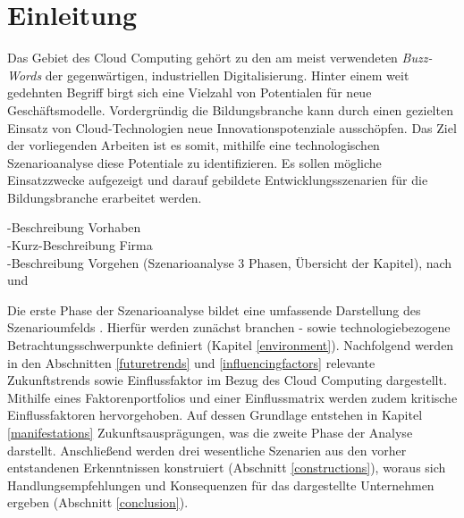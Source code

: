 \section{Einleitung}
\label{introduction}
Das Gebiet des Cloud Computing gehört zu den am meist verwendeten \textit{Buzz-Words} der gegenwärtigen, industriellen Digitalisierung.  Hinter einem weit gedehnten Begriff birgt sich eine Vielzahl von Potentialen für neue Geschäftsmodelle. Vordergründig die Bildungsbranche kann durch einen gezielten Einsatz von Cloud-Technologien neue Innovationspotenziale ausschöpfen.  Das Ziel der vorliegenden Arbeiten ist es somit, mithilfe eine technologischen Szenarioanalyse diese Potentiale zu identifizieren. Es sollen mögliche Einsatzzwecke aufgezeigt und darauf gebildete Entwicklungsszenarien für die Bildungsbranche erarbeitet werden.

-Beschreibung Vorhaben \\
-Kurz-Beschreibung Firma \\
-Beschreibung Vorgehen (Szenarioanalyse 3 Phasen, Übersicht der Kapitel), nach \cite{spath} und \cite{mietzner}

Die erste Phase der Szenarioanalyse bildet eine umfassende Darstellung des Szenarioumfelds  \cite{spath}. Hierfür werden zunächst branchen - sowie technologiebezogene Betrachtungsschwerpunkte definiert (Kapitel \ref{environment}). Nachfolgend werden in den Abschnitten \ref{futuretrends} und \ref{influencingfactors} relevante Zukunftstrends sowie Einflussfaktor im Bezug des Cloud Computing dargestellt. Mithilfe eines Faktorenportfolios und einer Einflussmatrix werden zudem kritische Einflussfaktoren hervorgehoben. Auf dessen Grundlage entstehen in Kapitel \ref{manifestations} Zukunftsausprägungen, was die zweite Phase der Analyse darstellt. Anschließend werden drei wesentliche Szenarien aus den vorher entstandenen Erkenntnissen konstruiert (Abschnitt \ref{constructions}), woraus sich Handlungsempfehlungen und Konsequenzen für das dargestellte Unternehmen ergeben (Abschnitt \ref{conclusion}).